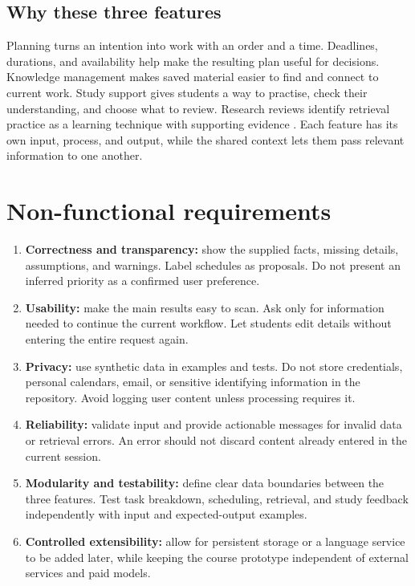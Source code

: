 \subsection*{Why these three features}

Planning turns an intention into work with an order and a time. Deadlines, durations, and availability help make the resulting plan useful for decisions. Knowledge management makes saved material easier to find and connect to current work. Study support gives students a way to practise, check their understanding, and choose what to review. Research reviews identify retrieval practice as a learning technique with supporting evidence \cite{dunlosky2013}. Each feature has its own input, process, and output, while the shared context lets them pass relevant information to one another.

\section{Non-functional requirements}

\begin{enumerate}
  \item \textbf{Correctness and transparency:} show the supplied facts, missing details, assumptions, and warnings. Label schedules as proposals. Do not present an inferred priority as a confirmed user preference.
  \item \textbf{Usability:} make the main results easy to scan. Ask only for information needed to continue the current workflow. Let students edit details without entering the entire request again.
  \item \textbf{Privacy:} use synthetic data in examples and tests. Do not store credentials, personal calendars, email, or sensitive identifying information in the repository. Avoid logging user content unless processing requires it.
  \item \textbf{Reliability:} validate input and provide actionable messages for invalid data or retrieval errors. An error should not discard content already entered in the current session.
  \item \textbf{Modularity and testability:} define clear data boundaries between the three features. Test task breakdown, scheduling, retrieval, and study feedback independently with input and expected-output examples.
  \item \textbf{Controlled extensibility:} allow for persistent storage or a language service to be added later, while keeping the course prototype independent of external services and paid models.
\end{enumerate}

